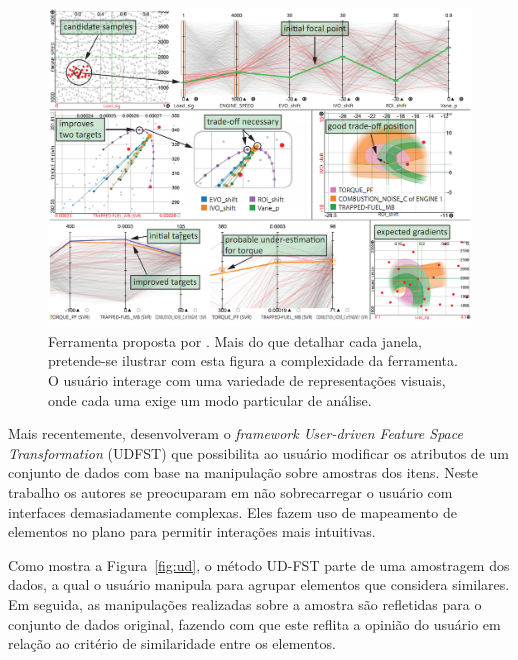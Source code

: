 \begin{figure}[h!]
    \centering
    \includegraphics[width=16cm]{images/berger.png}
    \caption[Ferramenta proposta por \cite{Berger2011}]
    {Ferramenta proposta por \cite{Berger2011}. Mais do que detalhar cada janela, pretende-se ilustrar com
esta figura a complexidade da ferramenta. O usuário interage
com uma variedade de representações visuais, onde cada uma exige
um modo particular de análise.}
    \label{fig:berger}
\end{figure}

Mais recentemente, \cite{Gladys2013} desenvolveram o
\emph{framework User-driven Feature Space Transformation}
(UDFST) que possibilita ao usuário modificar os
atributos de um conjunto de dados com base na manipulação
sobre amostras dos itens. Neste trabalho os autores se
preocuparam em não sobrecarregar o usuário com interfaces  
demasiadamente complexas. Eles fazem uso de mapeamento de
elementos no plano para permitir interações mais intuitivas.


Como mostra a Figura~\ref{fig:ud}, o método UD-FST parte de uma
amostragem dos dados, a qual o usuário manipula
para agrupar elementos que considera similares. Em seguida,
as manipulações realizadas sobre a amostra são refletidas
para o conjunto de dados original, fazendo com que este
reflita a opinião do usuário em relação ao critério de
similaridade entre os elementos.

